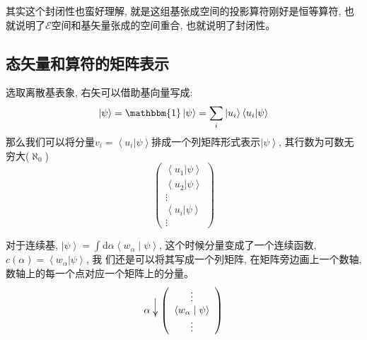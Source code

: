其实这个封闭性也蛮好理解, 就是这组基张成空间的投影算符刚好是恒等算符, 也就说明了$\mathscr{E}$空间和基矢量张成的空间重合, 也就说明了封闭性。

\subsection*{态矢量和算符的矩阵表示}
选取离散基表象, 右矢可以借助基向量写成:
\[\left | \psi  \right \rangle =\mathbbm{1}\left | \psi  \right \rangle =\sum\limits_{i}\left | u_i  \right \rangle \left\langle u_i|\psi  \right \rangle \]
那么我们可以将分量$v_i=\left\langle u_i|\psi  \right \rangle$排成一个列矩阵形式表示$\left|\psi\right\rangle$, 其行数为可数无穷大($\aleph_0$)
\begin{equation*}
    \begin{pmatrix}
        \left\langle u_1|\psi  \right \rangle \\
        \left\langle u_2|\psi  \right \rangle \\
        \vdots \\
        \left\langle u_i|\psi  \right \rangle\\
        \vdots 
    \end{pmatrix}
\end{equation*}

对于连续基, $\left|\psi\right\rangle=\int \mathrm{d}\alpha\left\langle w_{\alpha} \mid \psi\right\rangle$, 这个时候分量变成了一个连续函数, $c(\alpha)=\left\langle w_\alpha|\psi  \right \rangle$, 我
们还是可以将其写成一个列矩阵, 在矩阵旁边画上一个数轴, 数轴上的每一个点对应一个矩阵上的分量。
\begin{equation*}
    \alpha \longdownarrow{2.2} \left(\begin{array}{c}
    \vdots \\
    \left\langle w_{\alpha} \mid \psi\right\rangle \\
    \vdots
    \end{array}\right)
\end{equation*}

